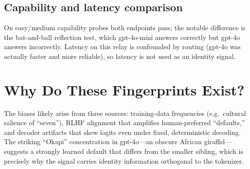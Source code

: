 \documentclass[11pt]{article}
\begin{document}
\subsection{Capability and latency comparison}
On easy/medium capability probes both endpoints pass; the notable difference is the bat-and-ball reflection test, which gpt-4o-mini answers correctly but gpt-4o answers incorrectly. Latency on this relay is confounded by routing (gpt-4o was actually faster and more reliable), so latency is not used as an identity signal.

\section{Why Do These Fingerprints Exist?}
The biases likely arise from three sources: training-data frequencies (e.g.\ cultural salience of ``seven''), RLHF alignment that amplifies human-preferred ``defaults,'' and decoder artifacts that skew logits even under fixed, deterministic decoding. The striking ``Okapi'' concentration in gpt-4o---an obscure African giraffid---suggests a strongly learned default that differs from the smaller sibling, which is precisely why the signal carries identity information orthogonal to the tokenizer.
\end{document}

